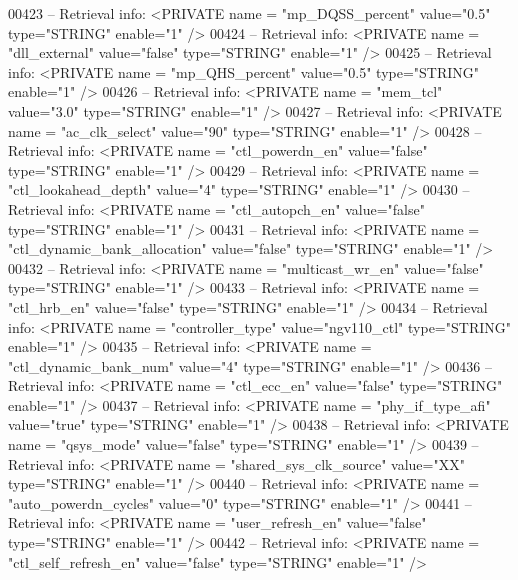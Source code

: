 \begin{DoxyCode}
{00423 \textcolor{keyword}{-- Retrieval info:      <PRIVATE name = "mp\_DQSS\_percent" value="0.5"  type="STRING"  enable="1" />}
00424 \textcolor{keyword}{-- Retrieval info:      <PRIVATE name = "dll\_external" value="false"  type="STRING"  enable="1" />}
00425 \textcolor{keyword}{-- Retrieval info:      <PRIVATE name = "mp\_QHS\_percent" value="0.5"  type="STRING"  enable="1" />}
00426 \textcolor{keyword}{-- Retrieval info:      <PRIVATE name = "mem\_tcl" value="3.0"  type="STRING"  enable="1" />}
00427 \textcolor{keyword}{-- Retrieval info:      <PRIVATE name = "ac\_clk\_select" value="90"  type="STRING"  enable="1" />}
00428 \textcolor{keyword}{-- Retrieval info:      <PRIVATE name = "ctl\_powerdn\_en" value="false"  type="STRING"  enable="1" />}
00429 \textcolor{keyword}{-- Retrieval info:      <PRIVATE name = "ctl\_lookahead\_depth" value="4"  type="STRING"  enable="1" />}
00430 \textcolor{keyword}{-- Retrieval info:      <PRIVATE name = "ctl\_autopch\_en" value="false"  type="STRING"  enable="1" />}
00431 \textcolor{keyword}{-- Retrieval info:      <PRIVATE name = "ctl\_dynamic\_bank\_allocation" value="false"  type="STRING" 
       enable="1" />}
00432 \textcolor{keyword}{-- Retrieval info:      <PRIVATE name = "multicast\_wr\_en" value="false"  type="STRING"  enable="1" />}
00433 \textcolor{keyword}{-- Retrieval info:      <PRIVATE name = "ctl\_hrb\_en" value="false"  type="STRING"  enable="1" />}
00434 \textcolor{keyword}{-- Retrieval info:      <PRIVATE name = "controller\_type" value="ngv110\_ctl"  type="STRING"  enable="1" />}
00435 \textcolor{keyword}{-- Retrieval info:      <PRIVATE name = "ctl\_dynamic\_bank\_num" value="4"  type="STRING"  enable="1" />}
00436 \textcolor{keyword}{-- Retrieval info:      <PRIVATE name = "ctl\_ecc\_en" value="false"  type="STRING"  enable="1" />}
00437 \textcolor{keyword}{-- Retrieval info:      <PRIVATE name = "phy\_if\_type\_afi" value="true"  type="STRING"  enable="1" />}
00438 \textcolor{keyword}{-- Retrieval info:      <PRIVATE name = "qsys\_mode" value="false"  type="STRING"  enable="1" />}
00439 \textcolor{keyword}{-- Retrieval info:      <PRIVATE name = "shared\_sys\_clk\_source" value="XX"  type="STRING"  enable="1" />}
00440 \textcolor{keyword}{-- Retrieval info:      <PRIVATE name = "auto\_powerdn\_cycles" value="0"  type="STRING"  enable="1" />}
00441 \textcolor{keyword}{-- Retrieval info:      <PRIVATE name = "user\_refresh\_en" value="false"  type="STRING"  enable="1" />}
00442 \textcolor{keyword}{-- Retrieval info:      <PRIVATE name = "ctl\_self\_refresh\_en" value="false"  type="STRING"  enable="1" />}
}
\end{DoxyCode}
